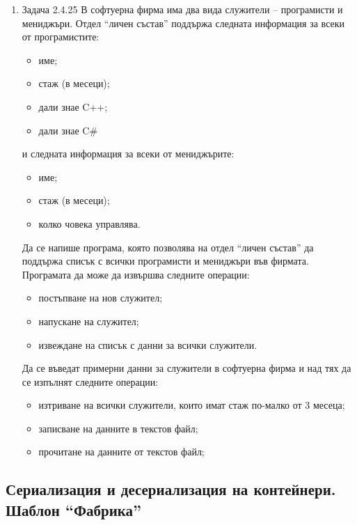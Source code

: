\begin{enumerate}
\begin{enumerate}[label=\alph*)]
\begin{flushleft}
      \end{flushleft}

    \end{enumerate}

    \item Задача 2.4.25\cite{sbornik2} В софтуерна фирма има два вида служители – програмисти и мениджъри. Отдел ``личен състав'' поддържа следната информация за всеки от програмистите:
    \begin{itemize}
      \item име;
      \item стаж (в месеци);
      \item дали знае C++;
      \item дали знае C\#
    \end{itemize}
    и следната информация за всеки от мениджърите:
    \begin{itemize}
      \item име;
      \item стаж (в месеци);
      \item колко човека управлява.
    \end{itemize}

    Да се напише програма, която позволява на отдел ``личен състав'' да поддържа списък с всички програмисти и мениджъри във фирмата. Програмата да може да извършва следните операции:
    \begin{itemize}
      \item постъпване на нов служител;
      \item напускане на служител;
      \item извеждане на списък с данни за всички служители.
    \end{itemize}

    Да се въведат примерни данни за служители  в софтуерна фирма и над тях да се изпълнят следните операции:

    \begin{itemize}
      \item изтриване на всички служители, които имат стаж по-малко от 3 месеца;
      \item записване на данните в текстов файл;
      \item прочитане на данните от текстов файл;
    \end{itemize}

\end{enumerate}

\pagebreak

\subsection{Сериализация и десериализация на контейнери. Шаблон ``Фабрика''}

